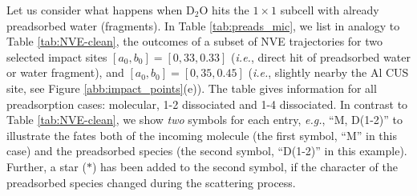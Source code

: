 \documentclass[11pt,DIV=13,BCOR=5mm,a4paper,headinclude]{scrbook}
\begin{document}
Let us consider what happens when D$_2$O hits the $1\times 1$ subcell with already preadsorbed water (fragments).
In Table \ref{tab:preads_mic}, we list in analogy to Table \ref{tab:NVE-clean}, the outcomes  of a subset of NVE trajectories for two selected impact sites $[a_0,b_0]=[0,33,0.33]$ (\textit{i.e.}, direct hit of preadsorbed water or water fragment), and $[a_0,b_0]=[0,35,0.45]$ (\textit{i.e.}, slightly nearby the Al CUS site, see Figure \ref{abb:impact_points}(e)).
The table gives information for all preadsorption cases: molecular, 1-2 dissociated and 1-4 dissociated.
In contrast to Table \ref{tab:NVE-clean}, we show \textit{two} symbols for each entry, \textit{e.g.}, ``M, D(1-2)'' to illustrate the fates both of the incoming molecule (the first symbol, ``M'' in this case) and the preadsorbed species (the second symbol, ``D(1-2)'' in this example).
Further, a star ($*$) has been added to the second symbol, if the character of the preadsorbed species changed during the scattering process.
\\
\end{document}

